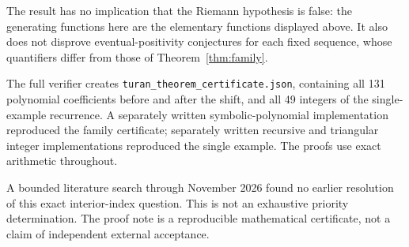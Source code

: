 \documentclass[11pt]{article}
\begin{document}
The result has no implication that the Riemann hypothesis is false:
the generating functions here are the elementary functions displayed above.
It also does not disprove eventual-positivity conjectures for each fixed
sequence, whose quantifiers differ from those of Theorem~\ref{thm:family}.

The full verifier creates \texttt{turan\_theorem\_certificate.json},
containing all 131 polynomial coefficients before and after the shift,
and all 49 integers of the single-example recurrence. A separately written
symbolic-polynomial implementation reproduced the family certificate;
separately written recursive and triangular integer implementations
reproduced the single example. The proofs use exact arithmetic throughout.

A bounded literature search through November 2026 found no earlier
resolution of this exact interior-index question. This is not an exhaustive
priority determination. The proof note is a reproducible mathematical
certificate, not a claim of independent external acceptance.

\appendix
\end{document}

